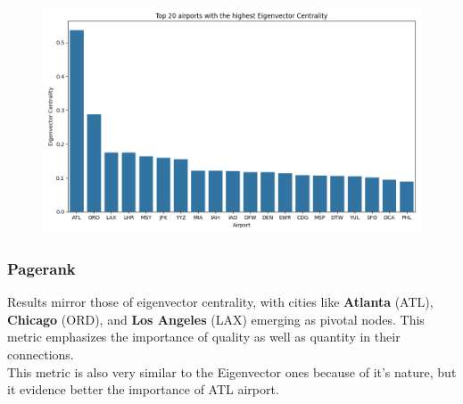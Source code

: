 \documentclass[12pt]{article}
\begin{document}
    \begin{figure}[H]
        \centering
        \includegraphics[width=0.8\linewidth]{img/eigenvector_centrality}
    \end{figure}

    \subsubsection{Pagerank}
    Results mirror those of eigenvector centrality, with cities like \textbf{Atlanta} (ATL), \textbf{Chicago} (ORD), and \textbf{Los Angeles} (LAX) emerging as pivotal nodes. This metric emphasizes the importance of quality as well as quantity in their connections.\\
    This metric is also very similar to the Eigenvector ones because of it's nature, but it evidence better the importance of ATL airport.
    
\end{document}
